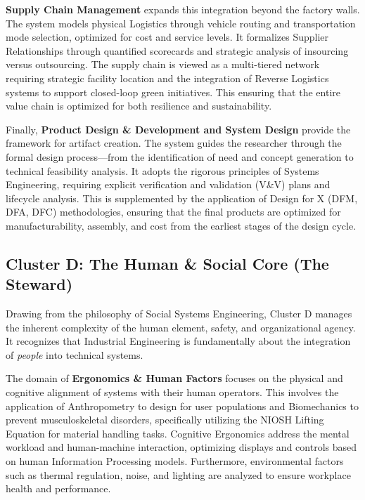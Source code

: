 \documentclass[12pt,a4paper]{article}
\begin{document}
\textbf{Supply Chain Management} expands this integration beyond the factory walls. The system models physical Logistics through vehicle routing and transportation mode selection, optimized for cost and service levels. It formalizes Supplier Relationships through quantified scorecards and strategic analysis of insourcing versus outsourcing. The supply chain is viewed as a multi-tiered network requiring strategic facility location and the integration of Reverse Logistics systems to support closed-loop green initiatives. This ensuring that the entire value chain is optimized for both resilience and sustainability.

Finally, \textbf{Product Design \& Development and System Design} provide the framework for artifact creation. The system guides the researcher through the formal design process—from the identification of need and concept generation to technical feasibility analysis. It adopts the rigorous principles of Systems Engineering, requiring explicit verification and validation (V\&V) plans and lifecycle analysis. This is supplemented by the application of Design for X (DFM, DFA, DFC) methodologies, ensuring that the final products are optimized for manufacturability, assembly, and cost from the earliest stages of the design cycle.

\subsection{Cluster D: The Human \& Social Core (The Steward)}

Drawing from the philosophy of Social Systems Engineering, Cluster D manages the inherent complexity of the human element, safety, and organizational agency. It recognizes that Industrial Engineering is fundamentally about the integration of \textit{people} into technical systems.

The domain of \textbf{Ergonomics \& Human Factors} focuses on the physical and cognitive alignment of systems with their human operators. This involves the application of Anthropometry to design for user populations and Biomechanics to prevent musculoskeletal disorders, specifically utilizing the NIOSH Lifting Equation for material handling tasks. Cognitive Ergonomics address the mental workload and human-machine interaction, optimizing displays and controls based on human Information Processing models. Furthermore, environmental factors such as thermal regulation, noise, and lighting are analyzed to ensure workplace health and performance.
\end{document}

